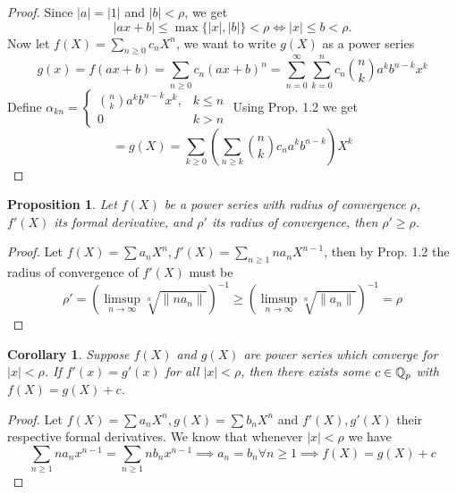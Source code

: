\documentclass[a4paper]{article}
\theoremstyle{plain}
\newtheorem{prop}[thm]{Proposition}
\newtheorem{Cor}[thm]{Corollary}
\theoremstyle{definition}
\begin{document}
\begin{proof}
  Since $|a| = |1|$ and $|b| < \rho$, we get
  $$|ax + b| \leq \max\{|x|, |b|\} < \rho \iff |x| \leq b < \rho.$$
  Now let $f(X) = \sum_{n \geq 0}c_{n}X^{n}$, we want to write $g(X)$ as a power series
  $$g(x) = f(ax+b) = \sum_{n \geq 0}c_{n}(ax+b)^{n} = \sum_{n = 0}^{\infty} \sum _{k=0}^{n}c_{n}\binom nk a^{k}b^{n-k}x^{k}$$
  Define $\alpha_{kn} = \begin{cases}\binom nk a^{k}b^{n-k}x^{k}, & k \leq n \\ 0 & k > n\end{cases}$
  Using Prop. 1.2 we get $$= g(X) = \sum_{k \geq 0}\left( \sum_{n \geq k} \binom nk c_{n}a^{k}b^{n-k}\right)X^{k}$$
\end{proof}
\begin{prop}
  Let $f(X)$ be a power series with radius of convergence $\rho$, $f'(X)$ its formal derivative, and $\rho'$ its radius of convergence, then $\rho' \geq \rho$.
\end{prop}
\begin{proof}
  Let $f(X) = \sum a_{n}X^{n}, f'(X) = \sum_{n \geq 1} na_{n}X^{n-1}$, then by Prop. 1.2 the radius of convergence of $f'(X)$ must be
  $$\rho' = \left( \limsup_{n \to \infty} \sqrt[n]{\|na_{n}\|} \right)^{-1} \geq \left( \limsup_{n \to \infty} \sqrt[n]{\|a_{n}\|} \right)^{-1} = \rho$$
\end{proof}
\begin{Cor} Suppose $f(X)$ and $g(X)$ are power series which converge for $|x| < \rho$. If $f'(x)=g'(x)$ for all $|x| < \rho$, then there exists some $c \in \Bbb Q_{p}$ with $f(X)=g(X)+c$.
\end{Cor}
\begin{proof}
  Let $f(X) = \sum a_{n}X^{n}, g(X) = \sum b_{n}X^{n}$ and $f'(X), g'(X)$ their respective formal derivatives. We know that whenever $|x| < \rho$ we have
  $$\sum_{n \geq 1}na_{n}x^{n-1} = \sum_{n \geq 1}nb_{n}x^{n-1} \implies a_{n} = b_{n} \forall n \geq 1 \implies f(X) = g(X) + c$$
\end{proof}
\end{document}

